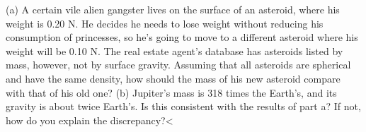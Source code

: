  (a) A certain vile alien gangster lives on the
surface of an asteroid, where his weight is 0.20 N. He
decides he needs to lose weight without reducing his
consumption of princesses, so he's going to move to a
different asteroid where his weight will be 0.10 N. The
real estate agent's database has asteroids listed by mass,
however, not by surface gravity. Assuming that all asteroids
are spherical and have the same density, how should the mass
of his new asteroid compare with that of his old one?\hwendpart
 (b)
Jupiter's mass is 318 times the Earth's, and its gravity is
about twice Earth's. Is this consistent with the results of
part a? If not, how do you explain the discrepancy?<%
